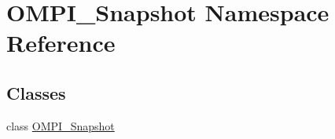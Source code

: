 \hypertarget{namespaceOMPI__Snapshot}{\section{O\-M\-P\-I\-\_\-\-Snapshot Namespace Reference}
\label{namespaceOMPI__Snapshot}
}
\subsection*{Classes}
\begin{DoxyCompactItemize}
\item 
class \hyperlink{classOMPI__Snapshot_1_1OMPI__Snapshot}{O\-M\-P\-I\-\_\-\-Snapshot}
\end{DoxyCompactItemize}
